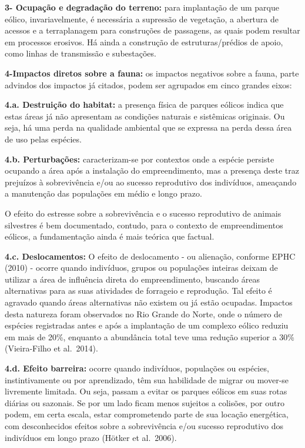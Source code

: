 \documentclass[
]{scrbook}
\begin{document}
\textbf{3- Ocupação e degradação do terreno:} para implantação de um parque eólico, invariavelmente, é necessária a supressão de vegetação, a abertura de acessos e a terraplanagem para construções de passagens, as quais podem resultar em processos erosivos. Há ainda a construção de estruturas/prédios de apoio, como linhas de transmissão e subestações.

\textbf{4-Impactos diretos sobre a fauna:} os impactos negativos sobre a fauna, parte advindos dos impactos já citados, podem ser agrupados em cinco grandes eixos:

\textbf{4.a. Destruição do habitat:} a presença física de parques eólicos indica que estas áreas já não apresentam as condições naturais e sistêmicas originais. Ou seja, há uma perda na qualidade ambiental que se expressa na perda dessa área de uso pelas espécies.

\textbf{4.b. Perturbações:} caracterizam-se por contextos onde a espécie persiste ocupando a área após a instalação do empreendimento, mas a presença deste traz prejuízos à sobrevivência e/ou ao sucesso reprodutivo dos indivíduos, ameaçando a manutenção das populações em médio e longo prazo.

O efeito do estresse sobre a sobrevivência e o sucesso reprodutivo de animais silvestres é bem documentado, contudo, para o contexto de empreendimentos eólicos, a fundamentação ainda é mais teórica que factual.

\textbf{4.c. Deslocamentos:} O efeito de deslocamento - ou alienação, conforme EPHC (2010) - ocorre quando indivíduos, grupos ou populações inteiras deixam de utilizar a área de influência direta do empreendimento, buscando áreas alternativas para as suas atividades de forrageio e reprodução. Tal efeito é agravado quando áreas alternativas não existem ou já estão ocupadas.
Impactos desta natureza foram observados no Rio Grande do Norte, onde o número de espécies registradas antes e após a implantação de um complexo eólico reduziu em mais de 20\%, enquanto a abundância total teve uma redução superior a 30\% (Vieira-Filho et al.~2014).

\textbf{4.d. Efeito barreira:} ocorre quando indivíduos, populações ou espécies, instintivamente ou por aprendizado, têm sua habilidade de migrar ou mover-se livremente limitada. Ou seja, passam a evitar os parques eólicos em suas rotas diárias ou sazonais. Se por um lado ficam menos sujeitos a colisões, por outro podem, em certa escala, estar comprometendo parte de sua locação energética, com desconhecidos efeitos sobre a sobrevivência e/ou sucesso reprodutivo dos indivíduos em longo prazo (Hötker et al.~2006).
\end{document}
